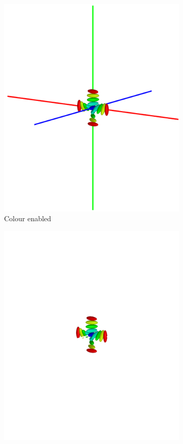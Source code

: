 \begin{figure}
\begin{center}
\begin{subfigure}{0.4\textwidth}
      \includegraphics[width=\linewidth]{assets/images/axes/2_colour}
      \caption{Colour enabled}
      \label{fig:original_axes_colour}
    \end{subfigure}
    \begin{subfigure}{0.4\textwidth}
      \includegraphics[width=\linewidth]{assets/images/axes/2_no_colour_bad}

\end{subfigure}
\end{center}
\end{figure}
